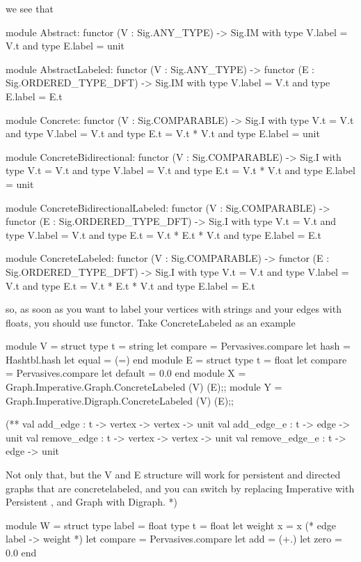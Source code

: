 \begin{enumerate}
we see that
\begin{bluetext}
module Abstract: 
functor (V : Sig.ANY_TYPE) -> Sig.IM  with type V.label = V.t and type E.label = unit

module AbstractLabeled: 
functor (V : Sig.ANY_TYPE) -> 
functor (E : Sig.ORDERED_TYPE_DFT) -> Sig.IM  with type V.label = V.t and type E.label = E.t

module Concrete: 
functor (V : Sig.COMPARABLE) -> Sig.I  with type V.t = V.t and type V.label = V.t and type E.t = V.t * V.t
	  and type E.label = unit

module ConcreteBidirectional: 
functor (V : Sig.COMPARABLE) -> Sig.I  with type V.t = V.t and type V.label = V.t and type E.t = V.t * V.t
and type E.label = unit

module ConcreteBidirectionalLabeled: 
functor (V : Sig.COMPARABLE) -> 
functor (E : Sig.ORDERED_TYPE_DFT) -> Sig.I  with type V.t = V.t and type V.label = V.t
and type E.t = V.t * E.t * V.t and type E.label = E.t

module ConcreteLabeled: 
functor (V : Sig.COMPARABLE) -> 
functor (E : Sig.ORDERED_TYPE_DFT) -> Sig.I  with type V.t = V.t and type V.label = V.t
	    and type E.t = V.t * E.t * V.t and type E.label = E.t

          \end{bluetext}

          so, as soon as you want to label your vertices with strings and your edges with floats, you should use functor. Take ConcreteLabeled as an example


          \begin{bluetext}
module V = struct
  type t = string
  let compare = Pervasives.compare
  let hash = Hashtbl.hash
  let equal = (=)
end
module E = struct
  type t = float
  let compare = Pervasives.compare
  let default = 0.0
end
module X = Graph.Imperative.Graph.ConcreteLabeled (V) (E);;
module Y = Graph.Imperative.Digraph.ConcreteLabeled (V) (E);; 

(**
    val add_edge : t -> vertex -> vertex -> unit
    val add_edge_e : t -> edge -> unit
    val remove_edge : t -> vertex -> vertex -> unit
    val remove_edge_e : t -> edge -> unit

    Not only that, but the V and E structure will work for
    persistent and directed graphs that are concretelabeled,
    and you can switch by replacing Imperative with Persistent
    , and Graph with Digraph.    
    *)

module W = struct
  type label = float
  type t = float
  let weight x = x (* edge label -> weight *)
  let compare = Pervasives.compare
  let add = (+.)
  let zero = 0.0
  end


\end{bluetext}
\end{enumerate}
